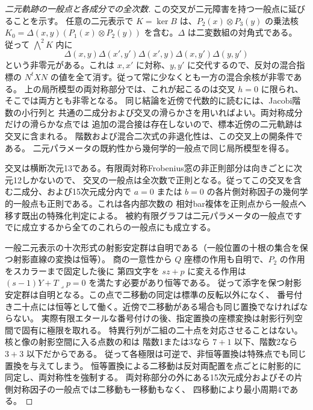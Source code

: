 \begin{proof}[二元軌跡の一般点と各成分での全次数]
この交叉が二元障害を持つ一般点に延びることを示す。
任意の二元表示で $K=\ker B$ は、$P_2(x)\otimes P_3(y)$ の乗法核
$K_0=\Delta(x,y)(P_1(x)\otimes P_2(y))$ を含む。$\Delta$ は二変数組の対角式である。
従って $\bigwedge^2 K$ 内に
\[
 \Delta(x,y)\Delta(x',y')\Delta(x',y)\Delta(x,y')\Delta(y,y')
\]
という非零元がある。これは $x,x'$ に対称、$y,y'$ に交代するので、反対の混合指標の
$N^tXN$ の値を全て消す。従って常に少なくとも一方の混合余核が非零である。
上の局所模型の両対称部分では、これが起こるのは交叉 $h=0$ に限られ、そこでは両方とも非零となる。
同じ結論を近傍で代数的に読むには、Jacobi階数の小行列と
共通の二成分および交叉の滑らかさを用いればよい。両対称成分だけの滑らかな点では
追加の混合接は存在しないので、標本近傍の二元軌跡は交叉に含まれる。
階数および混合二次式の非退化性は、この交叉上の開条件である。
二元パラメータの既約性から幾何学的一般点で同じ局所模型を得る。

交叉は横断次元13である。有限両対称Frobenius窓の非正則部分は向きごとに次元12しかないので、
交叉の一般点は全次数で正則となる。従ってこの交叉を含む二成分、および15次元成分内で
$a=0$ または $b=0$ の各片側対称因子の幾何学的一般点も正則である。これは各内部次数の
相対bar複体を正則点から一般点へ移す既出の特殊化判定による。
被約有限グラフは二元パラメータの一般点ですでに成立するから全てのこれらの一般点にも成立する。

一般二元表示の十次形式の射影安定群は自明である（一般位置の十根の集合を保つ射影直線の変換は恒等）。
商の一意性から $Q$ 座標の作用も自明で、$P_2$ の作用をスカラーまで固定した後に
第四文字を $sz+p$ に変える作用は $(s-1)Y+T\mathbin{\lrcorner}p=0$ を満たす必要があり恒等である。
従って添字を保つ射影安定群は自明となる。この点で二移動の同定は標準の反転以外になく、
番号付き二十点には恒等として働く。近傍で二移動がある場合も同じ置換でなければならない。
実際有限エタールな番号付けの後、指定置換の座標変換は射影行列空間で固有に極限を取れる。
特異行列が二組の二十点を対応させることはない。核と像の射影空間に入る点数の和は
階数1または3なら $7+1$ 以下、階数2なら $3+3$ 以下だからである。
従って各極限は可逆で、非恒等置換は特殊点でも同じ置換を与えてしまう。
恒等置換による二移動は反対両配置を点ごとに射影的に同定し、両対称性を強制する。
両対称部分の外にある15次元成分およびその片側対称因子の一般点では二移動も一移動もなく、
四移動により最小周期4である。
\end{proof}
